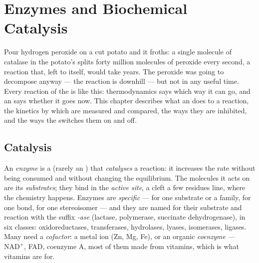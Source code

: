 \chapter{Enzymes and Biochemical Catalysis}\label{ch:b1:enzymes}

Pour hydrogen peroxide on a cut potato and it froths: a single molecule
of catalase in the potato's  splits forty million molecules of
peroxide every second, a reaction that, left to itself, would take
years. The peroxide was going to decompose anyway --- the reaction is
downhill --- but not in any useful time. Every reaction of the  is
like this: thermodynamics says which way it can go, and an
\emph{} says whether it goes now. This chapter describes what an
 does to a reaction, the kinetics by which  are measured
and compared, the ways they are inhibited, and the ways the 
switches them on and off.

\section{Catalysis}

\begin{definition}\label{def:b1:enzymes:enzyme}
An \emph{enzyme} is a  (rarely an ) that
\emph{catalyses} a reaction: it increases the rate without being
consumed and without changing the equilibrium. The molecules it acts
on are its \emph{substrates}; they bind in the
\emph{active site}, a cleft a few residues line,
where the chemistry happens. Enzymes are \emph{specific} --- for one
substrate or a family, for one bond, for one stereoisomer --- and they
are named for their substrate and reaction with the suffix
\emph{-ase} (lactase,  polymerase, succinate dehydrogenase), in six
classes: oxidoreductases, transferases, hydrolases, lyases, isomerases,
ligases. Many need a  \emph{cofactor}: a
metal ion (Zn, Mg, Fe), or an organic \emph{coenzyme}
--- $\mathrm{NAD^+}$, FAD, coenzyme A, most of them made from vitamins,
which is what vitamins are for.
\end{definition}

